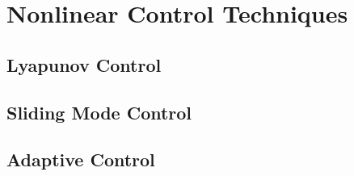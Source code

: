 \section{Nonlinear Control Techniques}

\subsection{Lyapunov Control}

\subsection{Sliding Mode Control}

\subsection{Adaptive Control}